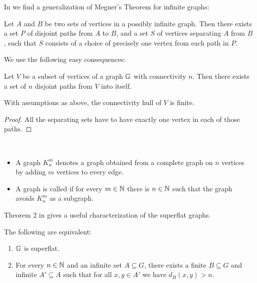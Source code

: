 In \cite{infinite_megner} we find a generalization of Megner's Theorem for infinite graphs:

\begin{Theorem} \label{megner}
  Let $A$ and $B$ be two sets of vertices in a possibly infinite graph. Then there exists a set $P$ of disjoint paths from $A$ to $B$, and a set $S$ of vertices separating $A$ from $B$, such that $S$ consists of a choice of precisely one vertex from each path in $P$.
\end{Theorem}

We use the following easy consequences:

\begin{Corollary} \label{cr_disjoint_paths}
  Let $V$ be a subset of vertices of a graph $\mathbb G$ with connectivity $n$. Then there exists a set of $n$ disjoint paths from $V$ into itself.
\end{Corollary}

\begin{Corollary} \label{cr_hull_finite}
  With assumptions as above, the connectivity hull of $V$ is finite.
\end{Corollary}

\begin{proof}
  All the separating sets have to have exactly one vertex in each of those paths. 
\end{proof}

\begin{Definition} \ 
  \begin{itemize}
    \item A graph $K^m_n$ denotes a graph obtained from a complete graph on $n$ vertices by adding $m$ vertices to every edge.
    \item A graph is called \defn{superflat} if for every $m \in \mathbb{N}$ there is $n \in \mathbb{N}$ such that the graph avoids $K^m_n$ as a subgraph. 
  \end{itemize}
\end{Definition}

Theorem 2 in \cite{stable_graphs} gives a useful characterization of the superflat graphs.

\begin{Theorem} \label{th_superflat_equivalence}
  The following are equivalent:
  \begin{enumerate}
  \item $\mathbb G$ is superflat.
  \item For every $n \in \mathbb{N}$ and an infinite set $A \subseteq G$, there exists a finite $B \subseteq G$ and infinite $A' \subseteq A$ such that for all $x,y \in A'$ we have $d_{B}(x, y) > n$.
  \end{enumerate}
\end{Theorem}

